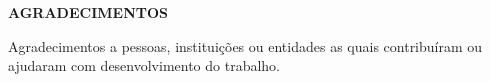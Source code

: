 \begin{newpage}
	\thispagestyle{empty}	
	\setlength{\parindent}{1.25cm} %
	\setlength{\baselineskip}{1.5\baselineskip} %
	\begin{center}
		\textbf{AGRADECIMENTOS} \\ [1.5\baselineskip]
	\end{center}
	
	Agradecimentos a pessoas, instituições ou entidades as quais contribuíram ou ajudaram com  desenvolvimento do trabalho.

\end{newpage}